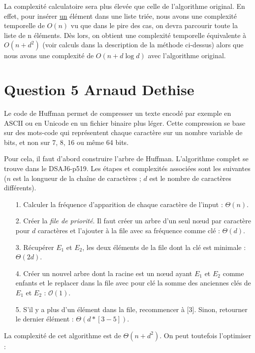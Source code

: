 \documentclass[10pt,a4paper]{article}
\begin{document}
La complexité calculatoire sera plus élevée que celle de l'algorithme original. En effet, pour insérer \underline{un} élément dans une liste triée, nous avons une complexité temporelle de $O(n)$ vu que dans le pire des cas, on devra parcourir toute la liste de n éléments. Dès lors, on obtient une complexité temporelle équivalente à $O(n + d^2)$ (voir calculs dans la description de la méthode ci-dessus) alors que nous avons une complexité de $O(n+d\log d)$ avec l'algorithme original.

\section*{Question 5 Arnaud Dethise}

	Le code de Huffman permet de compresser un texte encodé par exemple en ASCII ou en Unicode en un fichier binaire plus léger. Cette compression se base sur des mots-code qui représentent chaque caractère sur un nombre variable de bits, et non sur 7, 8, 16 ou même 64 bits.
	
	Pour cela, il faut d'abord construire l'arbre de Huffman. L'algorithme complet se trouve dans le DSAJ6-p519. Les étapes et complexités associées sont les suivantes ($n$ est la longueur de la chaîne de caractères ; $d$ est le nombre de caractères différents).
	\vspace{0.3cm}
	
	\begin{enumerate}
	\item[1.] Calculer la fréquence d'apparition de chaque caractère de l'input : $\Theta(n)$.
	\item[2.] Créer la \textit{file de priorité}. Il faut créer un arbre d'un seul nœud par caractère pour $d$ caractères et l'ajouter à la file avec sa fréquence comme clé : $\Theta(d)$.
	\item[3.] Récupérer $E_1$ et $E_2$, les deux éléments de la file dont la clé est minimale : $\Theta(2d)$.
	\item[4.] Créer un nouvel arbre dont la racine est un nœud ayant $E_1$ et $E_2$ comme enfants et le replacer dans la file avec pour clé la somme des anciennes clés de $E_1$ et $E_2$ : $\mathcal{O}(1)$.
	\item[5.] S'il y a plus d'un élément dans la file, recommencer à [3]. Sinon, retourner le dernier élément : $\Theta(d*[3-5])$.
	\end{enumerate}
	\vspace{0.3cm}
	
	La complexité de cet algorithme est de $\Theta(n + d^2)$. On peut toutefois l'optimiser :
	\vspace{0.3cm}
	
\end{document}
